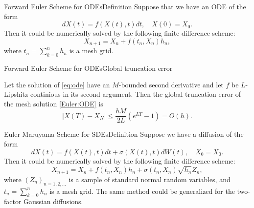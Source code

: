 \begin{frame}{Forward Euler Scheme for ODEs}{Definition}
    Suppose that we have an ODE of the form
    \begin{equation}
        dX(t) = f(X(t), t)dt, \quad X(0) = X_0. \label{eq:ode}
    \end{equation}
    Then it could be numerically solved by the following finite difference scheme:
    \begin{equation}
        X_{n+1} = X_n + f(t_n, X_n)h_n, \label{Euler:ODE}
    \end{equation}
    where $t_n = \sum_{k=0}^n h_n$ is a mesh grid. 
\end{frame}

\begin{frame}{Forward Euler Scheme for ODEs}{Global truncation error}
    \begin{lemma}
        Let the solution of \eqref{eq:ode} have an $M$-bounded second derivative and let $f$ be $L$-Lipshitz continious in its second argument. Then the global truncation error of the mesh solution \eqref{Euler:ODE} is
        \begin{equation}
            \left|X(T) - X_N\right| \leq \frac{hM}{2L}\left(e^{LT} - 1\right) = O(h).
        \end{equation}
    \end{lemma}
\end{frame}

\begin{frame}{Euler-Maruyama Scheme for SDEs}{Definition}
    Suppose we have a diffusion of the form 
    \begin{equation*}
        dX(t) = f(X(t), t)dt + \sigma(X(t), t)dW(t), \quad X_0 = X_0.
    \end{equation*}
    Then it could be numerically solved by the following finite difference scheme:
    \begin{equation}
        X_{n+1} = X_n + f(t_n, X_n)h_n + \sigma(t_n, X_n) \sqrt{h_n} Z_n, \label{Euler:SDE}
    \end{equation}
    where $(Z_n)_{n=1, 2, \dots}$ is a sample of standard normal random variables, and $t_n = \sum_{k=0}^n h_n$ is a mesh grid.
    The same method could be generalized for the two-factor Gaussian diffusions.
\end{frame}

